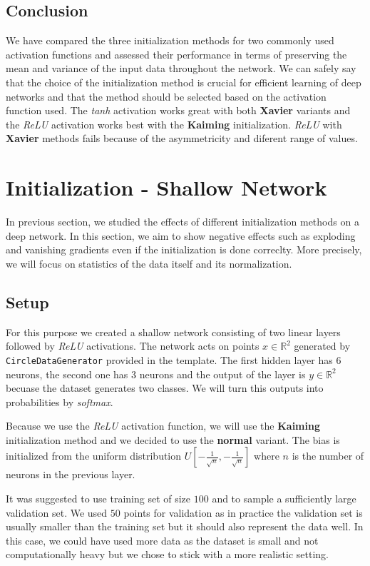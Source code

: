 \documentclass[a4paper,11pt]{article}
\begin{document}
\subsection{Conclusion}
We have compared the three initialization methods for two commonly used activation functions and assessed their performance in terms of preserving the mean and variance of the input data throughout the network.
We can safely say that the choice of the initialization method is crucial for efficient learning of deep networks and that the method should be selected based on the activation function used.
The \textit{tanh} activation works great with both \textbf{Xavier} variants and the \textit{ReLU} activation works best with the \textbf{Kaiming} initialization.
\textit{ReLU} with \textbf{Xavier} methods fails because of the asymmetricity and diferent range of values.

\section{Initialization - Shallow Network}
In previous section, we studied the effects of different initialization methods on a deep network.
In this section, we aim to show negative effects such as exploding and vanishing gradients even if the initialization is done correclty.
More precisely, we will focus on statistics of the data itself and its normalization.

\subsection{Setup}
For this purpose we created a shallow network consisting of two linear layers followed by \textit{ReLU} activations.
The network acts on points $x \in \mathbb{R}^2$ generated by \texttt{CircleDataGenerator} provided in the template.
The first hidden layer has $6$ neurons, the second one has $3$ neurons and the output of the layer is $y \in \mathbb{R}^2$ becuase the dataset generates two classes.
We will turn this outputs into probabilities by \textit{softmax}.

Because we use the \textit{ReLU} activation function, we will use the \textbf{Kaiming} initialization method and we decided to use the \textbf{normal} variant.
The bias is initialized from the uniform distribution $U\left[-\frac{1}{\sqrt{n}}, -\frac{1}{\sqrt{n}}\right]$ where $n$ is the number of neurons in the previous layer.

It was suggested to use training set of size $100$ and to sample a sufficiently large validation set.
We used $50$ points for validation as in practice the validation set is usually smaller than the training set but it should also represent the data well.
In this case, we could have used more data as the dataset is small and not computationally heavy but we chose to stick with a more realistic setting.
\end{document}
